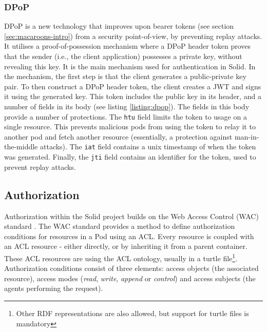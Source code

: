 \subsubsection{DPoP}
\label{sec:dpop}
\acrfull{DPoP} \citep{ietf-oauth-dpop} is a new technology that improves upon bearer tokens (see section \ref{sec:macaroons-intro}) from a security point-of-view, by preventing replay attacks. It utilises a proof-of-possession mechanism where a \gls{DPoP} header token proves that the sender (i.e., the client application) possesses a private key, without revealing this key. It is the main mechanism used for authentication in Solid. In the mechanism, the first step is that the client generates a public-private key pair. To then construct a \gls{DPoP} header token, the client creates a \gls{JWT} and signs it using the generated key. This token includes the public key in its header, and a number of fields in its body (see listing \ref{listing:dpop}).
{}
\noindent The fields in this body provide a number of protections. The \texttt{htu} field limits the token to usage on a single resource. This prevents malicious pods from using the token to relay it to another pod and fetch another resource (essentially, a protection against man-in-the-middle attacks). The \texttt{iat} field contains a unix timestamp of when the token was generated. Finally, the \texttt{jti} field contains an identifier for the token, used to prevent replay attacks.

\newpage
\subsection{Authorization}
\label{sec:solid-authorization}
Authorization within the Solid project builds on the Web Access Control (WAC) standard \citep{wac}. The WAC standard provides a method to define authorization conditions for resources in a Pod using an \gls{ACL}. Every resource is coupled with an \gls{ACL} resource - either directly, or by inheriting it from a parent container. These \gls{ACL} resources are using the \gls{ACL} ontology, usually in a turtle file\footnote{Other \gls{RDF} representations are also allowed, but support for turtle files is mandatory}. Authorization conditions consist of three elements: access objects (the associated resource), access modes (\textit{read}, \textit{write}, \textit{append} or \textit{control}) and access subjects (the agents performing the request).

